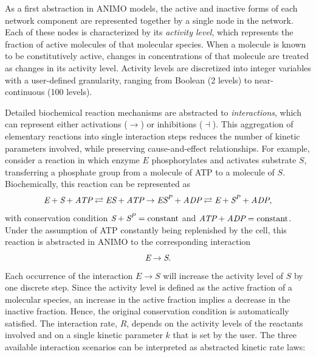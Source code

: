 \documentclass{bmcart}
\begin{document}
As a first abstraction in ANIMO models, the active and inactive forms of each network component
are represented together by a single node in the network.
Each of these nodes is characterized by its \emph{activity level}, which
represents the fraction of active molecules of that molecular species. When a molecule is known to be
constitutively active, changes in concentrations of that molecule are treated as changes in its activity level.
Activity levels are discretized into integer variables with a user-defined granularity, ranging from
Boolean (2 levels) to near-continuous (100 levels).

Detailed biochemical reaction mechanisms are abstracted to \emph{interactions}, which can
represent either activations ($\rightarrow$) or inhibitions ($\dashv$\hspace{0.1em}).
This aggregation of elementary reactions into single interaction steps reduces the number of kinetic
parameters involved, while preserving cause-and-effect relationships.
For example, consider a reaction in which enzyme $E$ phosphorylates and activates substrate $S$,
transferring a phosphate group from a molecule of ATP to a molecule of $S$. Biochemically, this reaction
can be represented as
$$
\mbox{\it E} + \mbox{\it S} + \mbox{\it ATP} \rightleftarrows \mbox{\it ES} + \mbox{\it ATP} \rightarrow \mbox{\it ES}^{\mbox{\scriptsize \it P}} + \mbox{\it ADP} \rightleftarrows \mbox{\it E} + \mbox{\it S}^{\mbox{\scriptsize\it P}} + \mbox{\it ADP},
$$
with conservation condition $\mbox{\it S} + \mbox{\it S}^{\mbox{\scriptsize\it P}} = \mbox{constant}$ and $\mbox{\it ATP} + \mbox{\it ADP} = \mbox{constant}$.\\
Under the assumption of ATP constantly being replenished by the cell, this reaction is abstracted in ANIMO to the corresponding interaction
$$
\mbox{\it E} \rightarrow \mbox{\it S}.
$$
Each occurrence of the interaction $E \rightarrow S$ will increase the activity level of $S$ by one discrete step.
Since the activity level is defined as the active fraction of a molecular species, an increase in the active fraction
implies a decrease in the inactive fraction. Hence, the original conservation condition is automatically
satisfied.
The interaction rate, $R$, depends on the activity levels of the reactants involved and on a single kinetic
parameter $k$ that is set by the user.
The three available interaction scenarios can be interpreted as abstracted kinetic rate laws:
\end{document}
